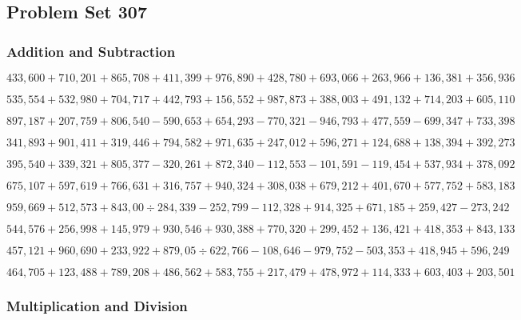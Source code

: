 \hypertarget{problem-set-307}{%
\subsection{Problem Set 307}\label{problem-set-307}}

\hypertarget{addition-and-subtraction}{%
\subsubsection{Addition and
Subtraction}\label{addition-and-subtraction}}

\(433,600+710,201+865,708+411,399+976,890+428,780+693,066+263,966+136,381+356,936\)

\(535,554+532,980+704,717+442,793+156,552+987,873+388,003+491,132+714,203+605,110\)

\(897,187+207,759+806,540-590,653+654,293-770,321-946,793+477,559-699,347+733,398\)

\(341,893+901,411+319,446+794,582+971,635+247,012+596,271+124,688+138,394+392,273\)

\(395,540+339,321+805,377-320,261+872,340-112,553-101,591-119,454+537,934+378,092\)

\(675,107+597,619+766,631+316,757+940,324+308,038+679,212+401,670+577,752+583,183\)

\(959,669+512,573+843,00÷284,339-252,799-112,328+914,325+671,185+259,427-273,242\)

\(544,576+256,998+145,979+930,546+930,388+770,320+299,452+136,421+418,353+843,133\)

\(457,121+960,690+233,922+879,05÷622,766-108,646-979,752-503,353+418,945+596,249\)

\(464,705+123,488+789,208+486,562+583,755+217,479+478,972+114,333+603,403+203,501\)

\hypertarget{multiplication-and-division}{%
\subsubsection{Multiplication and
Division}\label{multiplication-and-division}}

